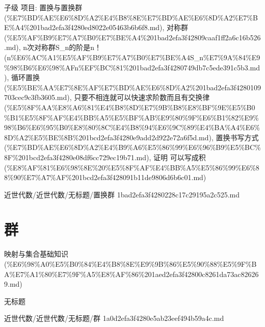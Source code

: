 \begin{note}[置换群]

子级 项目: 置换与置换群 (\%E7\%BD\%AE\%E6\%8D\%A2\%E4\%B8\%8E\%E7\%BD\%AE\%E6\%8D\%A2\%E7\%BE\%A4\%201bad2efa3f4280ed8022e05463b6b6f8.md), 对称群 (\%E5\%AF\%B9\%E7\%A7\%B0\%E7\%BE\%A4\%201bad2efa3f42809caaf1ff2a6c16b526.md), n次对称群S\_n的阶是n！ (n\%E6\%AC\%A1\%E5\%AF\%B9\%E7\%A7\%B0\%E7\%BE\%A4S\_n\%E7\%9A\%84\%E9\%98\%B6\%E6\%98\%AFn\%EF\%BC\%81\%201bad2efa3f4280749db7c5ede391c5b3.md), 循环置换  (\%E5\%BE\%AA\%E7\%8E\%AF\%E7\%BD\%AE\%E6\%8D\%A2\%201bad2efa3f4280109703cec9c3fb3605.md), 只要不相连就可以快速求阶数而且有交换律 (\%E5\%8F\%AA\%E8\%A6\%81\%E4\%B8\%8D\%E7\%9B\%B8\%E8\%BF\%9E\%E5\%B0\%B1\%E5\%8F\%AF\%E4\%BB\%A5\%E5\%BF\%AB\%E9\%80\%9F\%E6\%B1\%82\%E9\%98\%B6\%E6\%95\%B0\%E8\%80\%8C\%E4\%B8\%94\%E6\%9C\%89\%E4\%BA\%A4\%E6\%8D\%A2\%E5\%BE\%8B\%201bcd2efa3f4280e9add2d922e72a6f5d.md), 置换书写方式 (\%E7\%BD\%AE\%E6\%8D\%A2\%E4\%B9\%A6\%E5\%86\%99\%E6\%96\%B9\%E5\%BC\%8F\%201bcd2efa3f4280e08df6cc729ec19b71.md), 证明 可以写成积 (\%E8\%AF\%81\%E6\%98\%8E\%20\%E5\%8F\%AF\%E4\%BB\%A5\%E5\%86\%99\%E6\%88\%90\%E7\%A7\%AF\%201bcd2efa3f428091b11de9806d6b6c01.md)

\end{note}

\begin{note}[来源路径]

近世代数/近世代数/无标题/置换群 1bad2efa3f4280228c17c29195a2c525.md

\end{note}

\section*{群}

\begin{note}[来源上级主题]

映射与集合基础知识 (\%E6\%98\%A0\%E5\%B0\%84\%E4\%B8\%8E\%E9\%9B\%86\%E5\%90\%88\%E5\%9F\%BA\%E7\%A1\%80\%E7\%9F\%A5\%E8\%AF\%86\%201aed2efa3f42800c8261da73ac826269.md)

\end{note}

\begin{note}[群]

无标题

\end{note}

\begin{note}[来源路径]

近世代数/近世代数/无标题/群 1a0d2efa3f4280e5ab23eef494b59a4c.md

\end{note}

